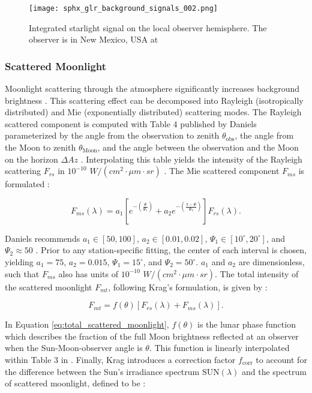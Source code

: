 \begin{figure}[ht]
  \centering
  \texttt{[image: sphx\_glr\_background\_signals\_002.png]}
  \caption{Integrated starlight signal on the local observer hemisphere. The observer is in New Mexico, USA at
  \pogslla}
  \label{fig:starlight_hemi}
\end{figure}

\subsubsection{Scattered Moonlight}

Moonlight scattering through the atmosphere significantly increases background brightness \cite{krag2003}. This scattering effect can be decomposed into Rayleigh (isotropically distributed) and Mie (exponentially distributed) scattering modes. The Rayleigh scattered component is computed with Table 4 published by Daniels parameterized by the angle from the observation to zenith $\theta_\mathrm{obs}$, the angle from the Moon to zenith $\theta_\mathrm{Moon}$, and the angle between the observation and the Moon on the horizon $\Delta Az$ \cite{daniels1977}. Interpolating this table yields the intensity of the Rayleigh scattering $F_{rs}$ in $10^{-10}$ $W/(cm^2 \cdot \mu m \cdot sr)$ \cite{krag2003}. The Mie scattered component $F_{ms}$ is formulated \cite{krag2003}:

\begin{equation} \label{eq:mie_scattering_moon}
  F_{ms}(\lambda) = a_1 \left[ e^{-\left(\frac{\Psi}{\Psi_1}\right)} + a_2 e^{-\left(\frac{\pi - \Psi}{\Psi_2}\right)} \right] F_{rs}(\lambda).
\end{equation}

Daniels recommends $a_1 \in [50, 100]$, $a_2 \in [0.01, 0.02]$, $\Psi_1 \in [10^\circ, 20^\circ]$, and $\Psi_2 \approx 50$ \cite{daniels1977}. Prior to any station-specific fitting, the center of each interval is chosen, yielding $a_1 = 75$, $a_2 = 0.015$, $\Psi_1 = 15^\circ$, and $\Psi_2 = 50^\circ$. $a_1$ and $a_2$ are dimensionless, such that $F_{ms}$ also has units of $10^{-10}$ $W/(cm^2 \cdot \mu m \cdot sr)$. The total intensity of the scattered moonlight $F_{mt}$, following Krag's formulation, is given by \cite{krag2003}:

\begin{equation} \label{eq:total_scattered_moonlight}
  F_{mt} = f(\theta) \left[ F_{rs}(\lambda) + F_{ms}(\lambda) \right].
\end{equation}

In Equation \ref{eq:total_scattered_moonlight}, $f(\theta)$ is the lunar phase function which describes the fraction of the full Moon brightness reflected at an observer when the Sun-Moon-observer angle is $\theta$. This function is linearly interpolated within Table 3 in \cite{daniels1977}. Finally, Krag introduces a correction factor $f_\mathrm{corr}$ to account for the difference between the Sun's irradiance spectrum $\mathrm{SUN}(\lambda)$ and the spectrum of scattered moonlight, defined to be \cite{krag2003}:

